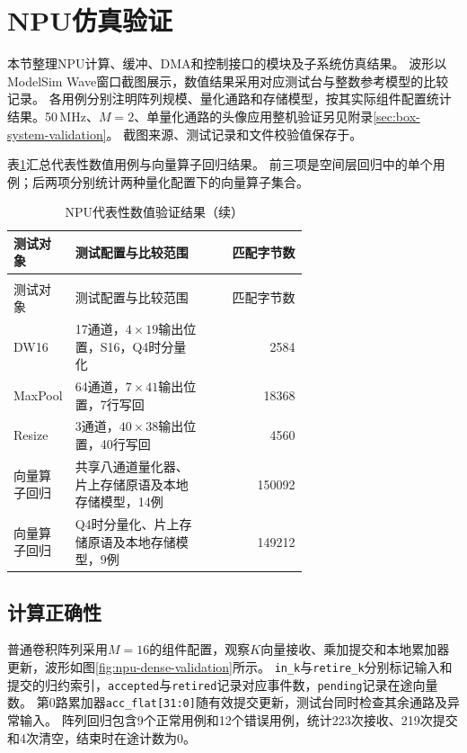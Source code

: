 \section{NPU仿真验证}

本节整理NPU计算、缓冲、DMA和控制接口的模块及子系统仿真结果。
波形以ModelSim Wave窗口截图展示，数值结果采用对应测试台与整数参考模型的比较记录。
各用例分别注明阵列规模、量化通路和存储模型，按其实际组件配置统计结果。50\,MHz、$M=2$、单量化通路的头像应用整机验证另见附录\ref{sec:box-system-validation}。
截图来源、测试记录和文件校验值保存于。

表\ref{tbl:npu-simulation-results}汇总代表性数值用例与向量算子回归结果。
前三项是空间层回归中的单个用例；后两项分别统计两种量化配置下的向量算子集合。

\begin{reporttable}
\small
\begin{longtable}{@{}p{0.19\linewidth}p{0.46\linewidth}r@{}}
\caption{NPU代表性数值验证结果}\label{tbl:npu-simulation-results}\\
\toprule
测试对象 & 测试配置与比较范围 & 匹配字节数 \\
\midrule
\endfirsthead
\caption[]{NPU代表性数值验证结果（续）}\\
\toprule
测试对象 & 测试配置与比较范围 & 匹配字节数 \\
\midrule
\endhead
\bottomrule
\endfoot
DW16 & 17通道，$4\times19$输出位置，S16，Q4时分量化 & 2584 \\
MaxPool & 64通道，$7\times41$输出位置，7行写回 & 18368 \\
Resize & 3通道，$40\times38$输出位置，40行写回 & 4560 \\
向量算子回归 & 共享八通道量化器、片上存储原语及本地存储模型，14例 & 150092 \\
向量算子回归 & Q4时分量化、片上存储原语及本地存储模型，9例 & 149212 \\
\end{longtable}
\end{reporttable}

\subsection{计算正确性}\label{sec:npu-compute-validation}

普通卷积阵列采用$M=16$的组件配置，观察$K$向量接收、乘加提交和本地累加器更新，波形如图\ref{fig:npu-dense-validation}所示。
\texttt{in\_k}与\texttt{retire\_k}分别标记输入和提交的归约索引，\texttt{accepted}与\texttt{retired}记录对应事件数，\texttt{pending}记录在途向量数。
第0路累加器\texttt{acc\_flat[31:0]}随有效提交更新，测试台同时检查其余通路及异常输入。
阵列回归包含9个正常用例和12个错误用例，统计223次接收、219次提交和4次清空，结束时在途计数为0。

